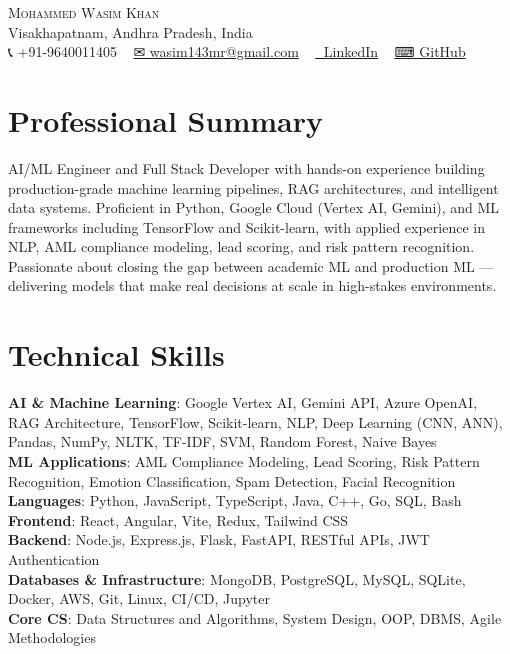 \documentclass[letterpaper,11pt]{article}
\begin{document}
\begin{center}
	{\Huge \scshape Mohammed Wasim Khan} \\ \vspace{1pt}
	Visakhapatnam, Andhra Pradesh, India \\ \vspace{1pt}
	\small 📞 +91-9640011405 ~
	\href{mailto:wasim143mr@gmail.com}{✉ wasim143mr@gmail.com} ~
	\href{https://linkedin.com/in/mohammed-wasim-khan-757595245}{🔗 LinkedIn} ~
	\href{https://github.com/wasim-builds}{⌨ GitHub}
	\vspace{-8pt}
\end{center}

\section{Professional Summary}
AI/ML Engineer and Full Stack Developer with hands-on experience building production-grade machine learning pipelines, RAG architectures, and intelligent data systems. Proficient in Python, Google Cloud (Vertex AI, Gemini), and ML frameworks including TensorFlow and Scikit-learn, with applied experience in NLP, AML compliance modeling, lead scoring, and risk pattern recognition. Passionate about closing the gap between academic ML and production ML — delivering models that make real decisions at scale in high-stakes environments.

\section{Technical Skills}
\begin{itemize}[leftmargin=0.15in, label={}]
	\small{\item{
			\textbf{AI \& Machine Learning}{: Google Vertex AI, Gemini API, Azure OpenAI, RAG Architecture, TensorFlow, Scikit-learn, NLP, Deep Learning (CNN, ANN), Pandas, NumPy, NLTK, TF-IDF, SVM, Random Forest, Naive Bayes} \\
			\textbf{ML Applications}{: AML Compliance Modeling, Lead Scoring, Risk Pattern Recognition, Emotion Classification, Spam Detection, Facial Recognition} \\
			\textbf{Languages}{: Python, JavaScript, TypeScript, Java, C++, Go, SQL, Bash} \\
			\textbf{Frontend}{: React, Angular, Vite, Redux, Tailwind CSS} \\
			\textbf{Backend}{: Node.js, Express.js, Flask, FastAPI, RESTful APIs, JWT Authentication} \\
			\textbf{Databases \& Infrastructure}{: MongoDB, PostgreSQL, MySQL, SQLite, Docker, AWS, Git, Linux, CI/CD, Jupyter} \\
			\textbf{Core CS}{: Data Structures and Algorithms, System Design, OOP, DBMS, Agile Methodologies}
	}}
\end{itemize}
\vspace{-16pt}
\end{document}
